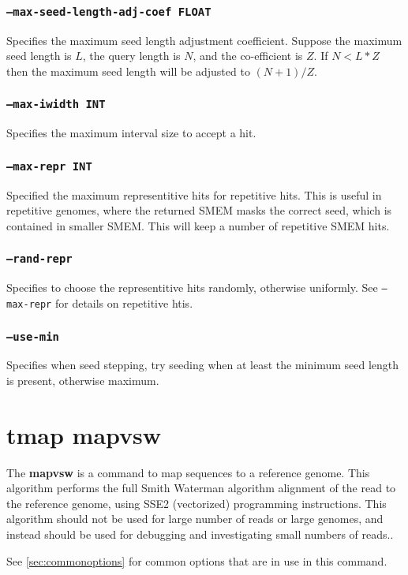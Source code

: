 \documentclass[a4paper,12pt]{book}
\newcommand{\TT}[1]{{\tt #1}} %
\newcommand{\BF}[1]{{\bf #1}} %
\begin{document}
\subsubsection{\TT{--max-seed-length-adj-coef FLOAT}}
Specifies the maximum seed length adjustment coefficient.
Suppose the maximum seed length is $L$, the query length is $N$, and the co-efficient is $Z$.
If $N < L * Z$ then the maximum seed length will be adjusted to $(N + 1) / Z$. 

\subsubsection{\TT{--max-iwidth INT}}
Specifies the maximum interval size to accept a hit.

\subsubsection{\TT{--max-repr INT}}
Specified the maximum representitive hits for repetitive hits.
This is useful in repetitive genomes, where the returned SMEM masks the correct seed, which is contained in smaller SMEM.
This will keep a number of repetitive SMEM hits.

\subsubsection{\TT{--rand-repr}}
Specifies to choose the representitive hits randomly, otherwise uniformly.
See \TT{--max-repr} for details on repetitive htis.

\subsubsection{\TT{--use-min}}
Specifies when seed stepping, try seeding when at least the minimum seed length is present, otherwise maximum.

\section{tmap mapvsw}
\label{sec:mapvsw}
The \BF{mapvsw} is a command to map sequences to a reference genome.
This algorithm performs the full Smith Waterman algorithm alignment of the read to the reference genome, using SSE2 (vectorized) programming instructions.
This algorithm should not be used for large number of reads or large genomes, and instead should be used for debugging and investigating small numbers of reads..

See \autoref{sec:commonoptions} for common options that are in use in this command.
\end{document}
